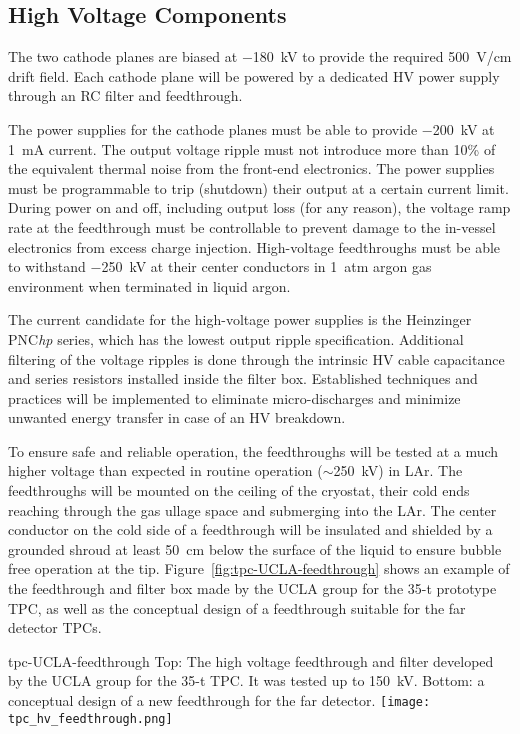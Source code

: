 \subsection{High Voltage Components}  
\label{subsec:fd-ref-hv}
   
The two cathode planes are biased at $-$180~kV to provide the required
500~V/cm drift field. Each cathode plane will be powered by a
dedicated HV power supply through an RC filter and feedthrough.

The power supplies for the cathode planes must be able to provide
$-$200~kV at 1~mA current. The output voltage ripple must not
introduce more than 10\% of the equivalent thermal noise from the
front-end electronics.  The power supplies must be programmable to
trip (shutdown) their output at a certain current limit.  During power
on and off, including output loss (for any reason), the voltage ramp
rate at the feedthrough must be controllable to prevent damage to the
in-vessel electronics %
from excess charge injection.  High-voltage
feedthroughs must be able to withstand $-$250~kV at their center
conductors in 1~atm argon gas environment when terminated in liquid
argon.


The current candidate for the high-voltage power supplies is the
Heinzinger PNC{\it hp} series, which has the lowest output ripple
specification.  Additional filtering of the voltage ripples is done
through the intrinsic HV cable capacitance and series resistors
installed inside the filter box. Established techniques and practices
will be implemented to eliminate micro-discharges and minimize
unwanted energy transfer in case of an HV breakdown.
  
To ensure safe and reliable operation, the feedthroughs will be tested
at a much higher voltage than expected in routine operation
($\sim$250~kV) in LAr. The feedthroughs will be mounted on
the ceiling of the cryostat, their cold ends reaching through the gas
ullage space and submerging into the LAr. The center
conductor on the cold side of a feedthrough will be insulated and
shielded by a grounded shroud at least 50~cm below the surface of the
liquid to ensure bubble free operation at the
tip. Figure~\ref{fig:tpc-UCLA-feedthrough} shows an example of the
feedthrough and filter box made by the UCLA group for the 35-t prototype TPC,
as well as the conceptual design of a feedthrough suitable for the far
detector TPCs.
\begin{cdrfigure}{tpc-UCLA-feedthrough}
{Top: The high voltage feedthrough and filter developed by the UCLA 
group for the 35-t TPC.  It was tested up to 150~kV.  
Bottom: a conceptual design of a new feedthrough for the far detector.}
\texttt{[image: tpc\_hv\_feedthrough.png]}
\end{cdrfigure}

